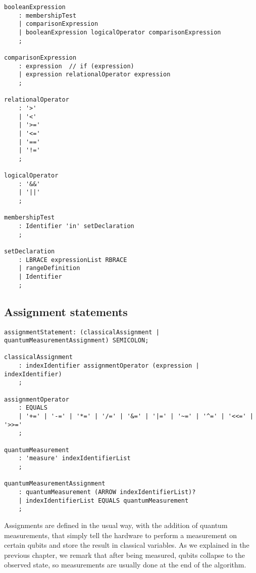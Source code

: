 \documentclass[12pt,a4paper]{report}
\theoremstyle{definition}
\theoremstyle{definition}
\theoremstyle{definition}
\begin{document}
\begin{lstlisting}
booleanExpression
    : membershipTest
    | comparisonExpression
    | booleanExpression logicalOperator comparisonExpression
    ;

comparisonExpression
    : expression  // if (expression)
    | expression relationalOperator expression
    ;

relationalOperator
    : '>'
    | '<'
    | '>='
    | '<='
    | '=='
    | '!='
    ;

logicalOperator
    : '&&'
    | '||'
    ;

membershipTest
    : Identifier 'in' setDeclaration
    ;

setDeclaration
    : LBRACE expressionList RBRACE
    | rangeDefinition
    | Identifier
    ;
\end{lstlisting}

\subsection{Assignment statements}
\begin{lstlisting}
assignmentStatement: (classicalAssignment | quantumMeasurementAssignment) SEMICOLON;

classicalAssignment
    : indexIdentifier assignmentOperator (expression | indexIdentifier)
    ;

assignmentOperator
    : EQUALS
    | '+=' | '-=' | '*=' | '/=' | '&=' | '|=' | '~=' | '^=' | '<<=' | '>>='
    ;

quantumMeasurement
    : 'measure' indexIdentifierList
    ;

quantumMeasurementAssignment
    : quantumMeasurement (ARROW indexIdentifierList)?
    | indexIdentifierList EQUALS quantumMeasurement
    ;
\end{lstlisting}
Assignments are defined in the usual way, with the addition of quantum measurements, that simply tell the hardware to perform a measurement on certain qubits and store the result in classical variables. As we explained in the previous chapter, we remark that after being measured, qubits collapse to the observed state, so measurements are usually done at the end of the algorithm.\\
\end{document}

